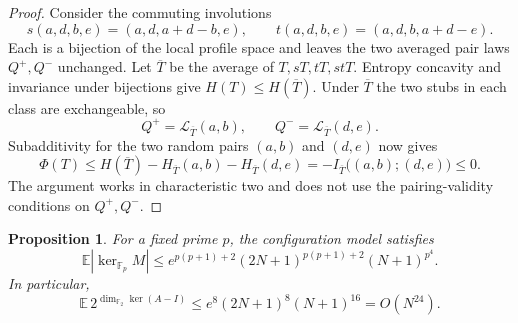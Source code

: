 \documentclass[11pt]{article}
\newtheorem{proposition}[theorem]{Proposition}
\theoremstyle{remark}
\newcommand{\F}{\mathbb F}
\newcommand{\E}{\mathbb E}
\newcommand{\1}{\mathbf 1}
\newcommand{\Law}{\mathcal L}
\begin{document}
\begin{proof}
Consider the commuting involutions
\[
 s(a,d,b,e)=(a,d,a+d-b,e),\qquad
 t(a,d,b,e)=(a,d,b,a+d-e).
\]
Each is a bijection of the local profile space and leaves the two
averaged pair laws $Q^+,Q^-$ unchanged. Let $\overline T$ be the
average of $T,sT,tT,stT$. Entropy concavity and invariance under
bijections give $H(T)\leq H(\overline T)$. Under $\overline T$ the
two stubs in each class are exchangeable, so
\[
 Q^+=\Law_{\overline T}(a,b),\qquad
 Q^-=\Law_{\overline T}(d,e).
\]
Subadditivity for the two random pairs $(a,b)$ and $(d,e)$ now gives
\[
 \Phi(T)\leq H(\overline T)-H_{\overline T}(a,b)
                   -H_{\overline T}(d,e)
 =-I_{\overline T}\bigl((a,b);(d,e)\bigr)\leq0.
\]
The argument works in characteristic two and does not use the
pairing-validity conditions on $Q^+,Q^-$.
\end{proof}

\begin{proposition}\label{prop:moment-config}
For a fixed prime $p$, the configuration model satisfies
\begin{equation}\label{eq:moment-general}
 \E|\ker_{\F_p}M|
 \leq e^{p(p+1)+2}(2N+1)^{p(p+1)+2}(N+1)^{p^4}.
\end{equation}
In particular,
\begin{equation}\label{eq:moment-two-config}
 \E\,2^{\dim_{\F_2}\ker(A-I)}
 \leq e^8(2N+1)^8(N+1)^{16}=O(N^{24}).
\end{equation}
\end{proposition}
\end{document}
